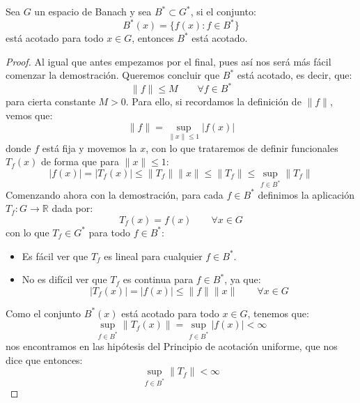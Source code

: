 \begin{coro}\label{coro:entonces_Bast_acotado}
    Sea $G$ un espacio de Banach y sea $B^\ast\subset G^\ast$, si el conjunto:
    \begin{equation*}
        B^\ast(x) = \{f(x) : f\in B^\ast\}
    \end{equation*}
    está acotado para todo $x\in G$, entonces $B^\ast$ está acotado.
    \begin{proof}
        Al igual que antes empezamos por el final, pues así nos será más fácil comenzar la demostración. Queremos concluir que $B^\ast$ está acotado, es decir, que:
        \begin{equation*}
            \|f\| \leq M\qquad \forall f\in B^\ast
        \end{equation*}
        para cierta constante $M>0$. Para ello, si recordamos la definición de $\|f\|$, vemos que:
        \begin{equation*}
            \|f\| = \sup_{\|x\|\leq 1}|f(x)|
        \end{equation*}
        donde $f$ está fija y movemos la $x$, con lo que trataremos de definir funcionales $T_f(x)$ de forma que para $\|x\|\leq 1$:
        \begin{equation*}
            |f(x)| = |T_f(x)| \leq \|T_f\|\|x\| \leq \|T_f\| \leq \sup_{f\in B^\ast}\|T_f\|
        \end{equation*}
        Comenzando ahora con la demostración, para cada $f\in B^\ast$ definimos la aplicación $T_f:G\to \mathbb{R}$ dada por:
        \begin{equation*}
            T_f(x) = f(x) \qquad \forall x\in G
        \end{equation*}
        con lo que $T_f\in G^\ast$ para todo $f\in B^\ast$:
        \begin{itemize}
            \item Es fácil ver que $T_f$ es lineal para cualquier $f\in B^\ast$.
            \item No es difícil ver que $T_f$ es continua para $f\in B^\ast$, ya que:
                \begin{equation*}
                    |T_f(x)| = |f(x)| \leq \|f\|\|x\| \qquad \forall x\in G
                \end{equation*}
        \end{itemize}
        Como el conjunto $B^\ast(x)$ está acotado para todo $x\in G$, tenemos que:
        \begin{equation*}
            \sup_{f\in B^\ast}\|T_f(x)\| = \sup_{f\in B^\ast}|f(x)| < \infty
        \end{equation*}
        nos encontramos en las hipótesis del Principio de acotación uniforme, que nos dice que entonces:
        \begin{equation*}
            \sup_{f\in B^\ast}\|T_f\| < \infty
        \end{equation*}


\end{proof}
\end{coro}
